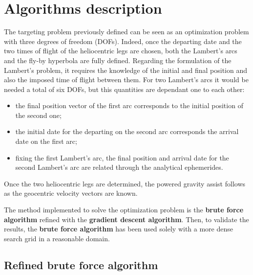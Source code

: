 \section{Algorithms description}
\label{sec:algo_description}

The targeting problem previously defined can be seen as an optimization problem with three degrees of freedom (DOFs). Indeed, once the departing date and the two times of flight of the heliocentric legs are chosen, both the Lambert's arcs and the fly-by hyperbola are fully defined.  
Regarding the formulation of the Lambert's problem, it requires the knowledge of the initial and final position and also the imposed time of flight between them. For two Lambert's arcs it would be needed a total of six DOFs, but this quantities are dependant one to each other:
\begin{itemize}
    [wide,itemsep=3pt,topsep=3pt]
    \item the final position vector of the first arc corresponds to the initial position of the second one;
    \item the initial date for the departing on the second arc corresponds the arrival date on the first arc;
    \item fixing the first Lambert's arc, the final position and arrival date for the second Lambert's arc are related through the analytical ephemerides.
\end{itemize}

\pagebreak

Once the two heliocentric legs are determined, the powered gravity assist follows as the geocentric velocity vectors are known.

The method implemented to solve the optimization problem is the \textbf{brute force algorithm} refined with the \textbf{gradient descent algorithm}. Then, to validate the results, the \textbf{brute force algorithm} has been used solely with a more dense search grid in a reasonable domain. 

\subsection{Refined brute force algorithm}
\label{subsec:brute_force_algo}

